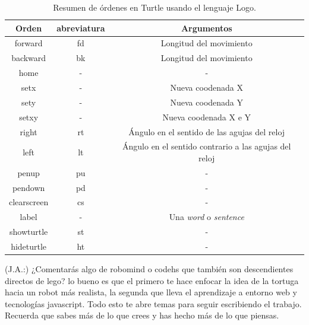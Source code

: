 \begin{table}[!ht]
	\begin{centering}
		\begin{tabular}{c|c|c}
Orden & abreviatura & Argumentos\\
\hline
forward & fd & Longitud del movimiento\\
backward & bk & Longitud del movimiento\\
home & - & -\\
setx & - & Nueva coodenada X\\
sety & - & Nueva coodenada Y\\
setxy & - & Nueva coodenada X e Y\\
right & rt & Ángulo en el sentido de las agujas del reloj\\
left & lt & Ángulo en el sentido contrario a las agujas del reloj\\
penup & pu & -\\
pendown & pd & -\\
clearscreen & cs & -\\
label & - & Una \emph{word} o \emph{sentence}\\
showturtle & st & -\\
hideturtle & ht & -\\
\end{tabular}
	\caption{Resumen de órdenes en Turtle usando el lenguaje Logo.}
		\label{tab:turtle-lenguaje}
	\end{centering}
\end{table}










{\color{green}
(J.A.:) ¿Comentarás algo de robomind o codehs que también son descendientes directos de lego? lo bueno es que el primero te hace enfocar la idea de la tortuga hacia un robot más realista, la segunda que lleva el aprendizaje a entorno web y tecnologías javascript. Todo esto te abre temas para seguir escribiendo el trabajo. Recuerda que sabes más de lo que crees y has hecho más de lo que piensas.
}



